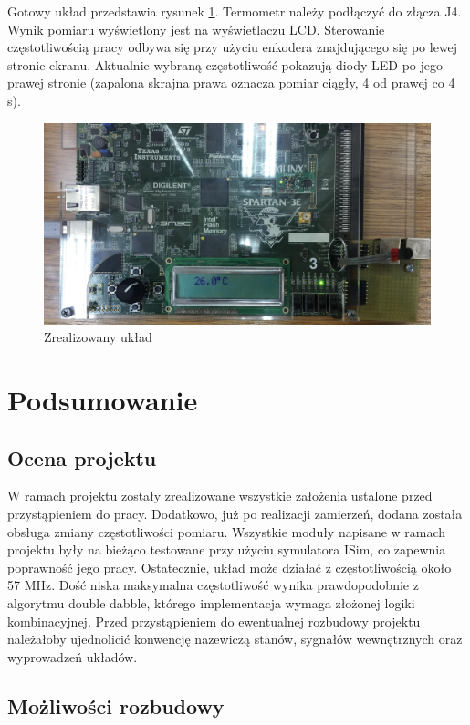 \documentclass[a4paper]{article}
\begin{document}
Gotowy układ przedstawia rysunek \ref{photo}. Termometr należy podłączyć do złącza J4. Wynik pomiaru wyświetlony jest na wyświetlaczu LCD. Sterowanie częstotliwością pracy odbywa się przy użyciu enkodera znajdującego się po lewej stronie ekranu. Aktualnie wybraną częstotliwość pokazują diody LED po jego prawej stronie (zapalona skrajna prawa oznacza pomiar ciągły, 4 od prawej co 4 s).

\begin{figure}[H]
\begin{center}
\includegraphics[width=16cm]{graphics/photo.png}
\end{center}
\caption{Zrealizowany układ}
\label{photo}
\end{figure} 

\section{Podsumowanie}
\subsection{Ocena projektu}

W ramach projektu zostały zrealizowane wszystkie założenia ustalone przed przystąpieniem do pracy. Dodatkowo, już po realizacji zamierzeń, dodana została obsługa zmiany częstotliwości pomiaru. Wszystkie moduły napisane w ramach projektu były na bieżąco testowane przy użyciu symulatora ISim, co zapewnia poprawność jego pracy. Ostatecznie, układ może działać z częstotliwością około 57 MHz. Dość niska maksymalna częstotliwość wynika prawdopodobnie z algorytmu double dabble, którego implementacja wymaga złożonej logiki kombinacyjnej. Przed przystąpieniem do ewentualnej rozbudowy projektu należałoby ujednolicić konwencję nazewiczą stanów, sygnałów wewnętrznych oraz wyprowadzeń układów.

\subsection{Możliwości rozbudowy}
\end{document}
